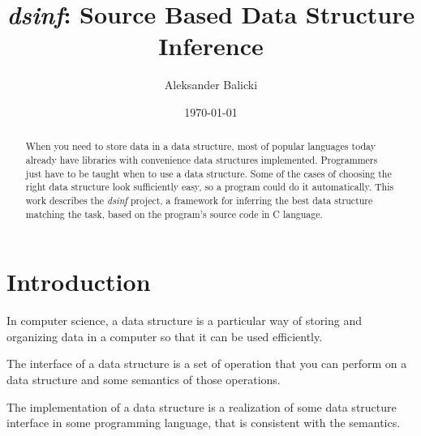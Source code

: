 \documentclass[a4paper,11pt]{article}
\title{\emph{dsinf}: Source Based Data Structure Inference}
\author{Aleksander Balicki}
\date{\today}
\begin{document}
\vfill

\maketitle

\begin{abstract}

	When you need to store data in a data structure, most of popular languages today already
	have libraries with convenience data structures implemented. Programmers just have to be taught when to
	use a data structure. Some of the cases of choosing the right data structure look sufficiently easy,
	so a program could do it automatically. This work describes the \emph{dsinf} project, a framework for
	inferring the best data structure matching the task, based on the program's source code in C language.

\end{abstract}

\pagebreak

\tableofcontents

\vfill

\section{Introduction} \label{sec:intro}
	In computer science, a data structure is a particular way of storing and organizing data in a computer so that
	it can be used efficiently\cite{Wi}.

	The interface of a data structure is a set of operation that you can perform on a data structure and some
	semantics of those operations.

	The implementation of a data structure is a realization of some data structure interface in some programming
	language, that is consistent with the semantics.
\end{document}
